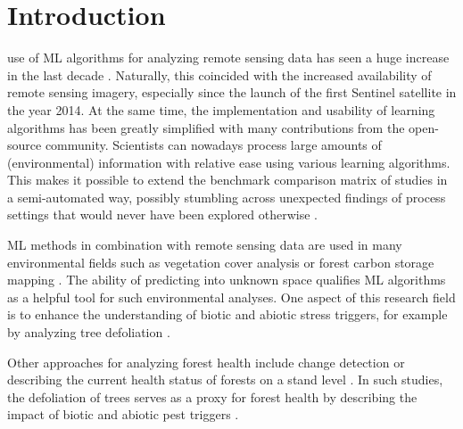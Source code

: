 \documentclass[final]{IEEEtran}
\begin{document}
\section{Introduction}


 use of \ac{ML} algorithms for analyzing remote sensing data has seen a huge increase in the last decade \cite{lary2016}.
Naturally, this coincided with the increased availability of remote sensing imagery, especially since the launch of the first Sentinel satellite in the year 2014.
At the same time, the implementation and usability of learning algorithms has been greatly simplified with many contributions from the open-source community.
Scientists can nowadays process large amounts of (environmental) information with relative ease using various learning algorithms.
This makes it possible to extend the benchmark comparison matrix of studies in a semi-automated way, possibly stumbling across unexpected findings of process settings that would never have been explored otherwise \cite{ma2015}.


ML methods in combination with remote sensing data are used in many environmental fields such as vegetation cover analysis or forest carbon storage mapping \cite{mascaro2014, urban2018}.
The ability of predicting into unknown space qualifies ML algorithms as a helpful tool for such environmental analyses.
One aspect of this research field is to enhance the understanding of biotic and abiotic stress triggers, for example by analyzing tree defoliation \cite{hawrylo2018}.

Other approaches for analyzing forest health include change detection \cite{zhang2016} or describing the current health status of forests on a stand level \cite{townsend2012}.
In such studies, the defoliation of trees serves as a proxy for forest health by describing the impact of biotic and abiotic pest triggers \cite{townsend2012, goodbody2018}.
\end{document}
